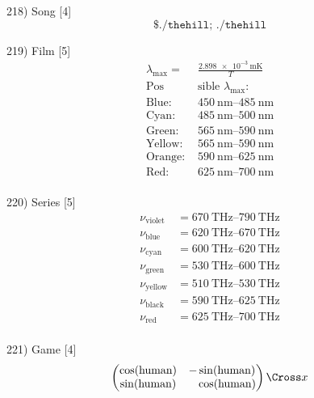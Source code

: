 \documentclass[10pt]{article}
\begin{document}
  218) Song [4]
  \[
    \texttt{\$ ./thehill; ./thehill}
  \]

  219) Film [5]
  \[
    \begin{split}
      \lambda_\text{max} =&\frac{\SI{2.898e-3}{\metre\kelvin}}{T} \\
      \text{Pos} &\text{sible } \lambda_\text{max}: \\
      \text{Blue: } & \SI{450}{\nano\metre}\text{--}\SI{485}{\nano\metre} \\
      \text{Cyan: } & \SI{485}{\nano\metre}\text{--}\SI{500}{\nano\metre} \\
      \text{Green: } & \SI{565}{\nano\metre}\text{--}\SI{590}{\nano\metre} \\
      \text{Yellow: } & \SI{565}{\nano\metre}\text{--}\SI{590}{\nano\metre} \\
      \text{Orange: } & \SI{590}{\nano\metre}\text{--}\SI{625}{\nano\metre} \\
      \text{Red: } & \SI{625}{\nano\metre}\text{--}\SI{700}{\nano\metre} \\
    \end{split}
  \]

  220) Series [5]
  \[
    \begin{split}
      \nu_\text{violet} &= \SI{670}{\tera\hertz}\text{--}\SI{790}{\tera\hertz}\\
      \nu_\text{blue} &= \SI{620}{\tera\hertz}\text{--}\SI{670}{\tera\hertz} \\
      \nu_\text{cyan} &= \SI{600}{\tera\hertz}\text{--}\SI{620}{\tera\hertz} \\
      \nu_\text{green} &= \SI{530}{\tera\hertz}\text{--}\SI{600}{\tera\hertz} \\
      \nu_\text{yellow} &= \SI{510}{\tera\hertz}\text{--}\SI{530}{\tera\hertz} \\
      \nu_\text{black} &= \SI{590}{\tera\hertz}\text{--}\SI{625}{\tera\hertz} \\
      \nu_\text{red} &= \SI{625}{\tera\hertz}\text{--}\SI{700}{\tera\hertz} \\
    \end{split}
  \]

  221) Game [4]
  \[
    \begin{pmatrix}
      \cos(\text{human}) & - \sin(\text{human}) \\
      \sin(\text{human}) & \phantom{-}\cos(\text{human}) \\
    \end{pmatrix}
      \text{\Cross}    x 
  \]
\end{document}
